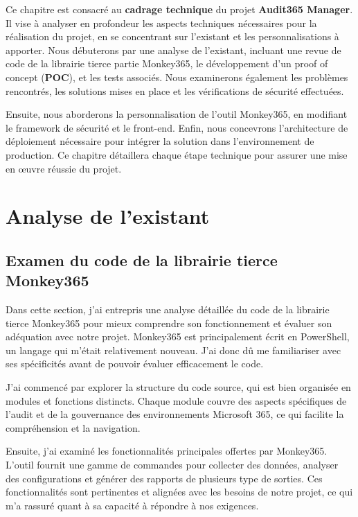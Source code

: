Ce chapitre est consacré au \textbf{cadrage technique} du projet \textbf{Audit365 Manager}. Il vise à analyser en profondeur les aspects techniques nécessaires pour la réalisation du projet, en se concentrant sur l'existant et les personnalisations à apporter. Nous débuterons par une analyse de l'existant, incluant une revue de code de la librairie tierce partie Monkey365, le développement d'un proof of concept (\textbf{POC}), et les tests associés. Nous examinerons également les problèmes rencontrés, les solutions mises en place et les vérifications de sécurité effectuées.

Ensuite, nous aborderons la personnalisation de l'outil Monkey365, en modifiant le framework de sécurité et le front-end. Enfin, nous concevrons l'architecture de déploiement nécessaire pour intégrer la solution dans l'environnement de production. Ce chapitre détaillera chaque étape technique pour assurer une mise en œuvre réussie du projet.

\section{Analyse de l’existant}
\subsection{Examen du code de la librairie tierce Monkey365}

Dans cette section, j'ai entrepris une analyse détaillée du code de la librairie tierce Monkey365 pour mieux comprendre son fonctionnement et évaluer son adéquation avec notre projet. Monkey365 est principalement écrit en PowerShell, un langage qui m'était relativement nouveau. J'ai donc dû me familiariser avec ses spécificités avant de pouvoir évaluer efficacement le code.

J'ai commencé par explorer la structure du code source, qui est bien organisée en modules et fonctions distincts. Chaque module couvre des aspects spécifiques de l'audit et de la gouvernance des environnements Microsoft 365, ce qui facilite la compréhension et la navigation.

Ensuite, j'ai examiné les fonctionnalités principales offertes par Monkey365. L'outil fournit une gamme de commandes pour collecter des données, analyser des configurations et générer des rapports de plusieurs type de sorties. Ces fonctionnalités sont pertinentes et alignées avec les besoins de notre projet, ce qui m'a rassuré quant à sa capacité à répondre à nos exigences.

